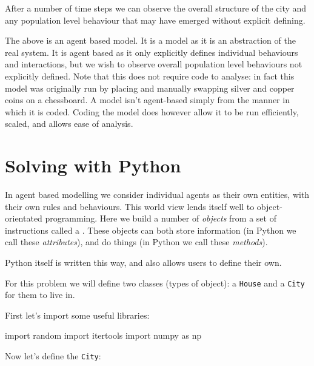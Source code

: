 After a number of time steps we can observe the overall structure of the city
and any population level behaviour that may have emerged without explicit
defining.

The above is an agent based model.
It is a model as it is an abstraction of the real system.
It is agent based as it only explicitly defines individual behaviours and
interactions, but we wish to observe overall population level behaviours not
explicitly defined.
Note that this does not require code to analyse: in fact this model was
originally run by placing and manually swapping silver and copper coins on a
chessboard.
A model isn't agent-based simply from the manner in which it is coded.
Coding the model does however allow it to be run efficiently, scaled, and allows
ease of analysis.


\section{Solving with Python}\label{sec:solving-with-python}
In agent based modelling we consider individual agents as their own entities,
with their own rules and behaviours.
This world view lends itself well to object-orientated programming.
Here we build a number of \textit{objects} from a set of instructions called a
.
These objects can both store information (in Python we call these
\textit{attributes}), and do things (in Python we call these \textit{methods}).

Python itself is written this way, and also allows users to define their own.

For this problem we will define two classes (types of object): a
\texttt{House} and a \texttt{City} for them to live in.

First let's import some useful libraries:

\begin{pyin}
import random
import itertools
import numpy as np
\end{pyin}

Now let's define the \texttt{City}:

